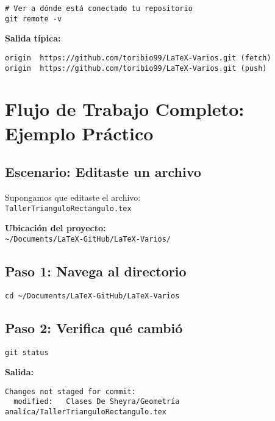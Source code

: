 \documentclass[12pt,a4paper]{article}
\begin{document}
\begin{lstlisting}[style=bashstyle]
# Ver a dónde está conectado tu repositorio
git remote -v
\end{lstlisting}

\textbf{Salida típica:}
\begin{lstlisting}[style=bashstyle]
origin  https://github.com/toribio99/LaTeX-Varios.git (fetch)
origin  https://github.com/toribio99/LaTeX-Varios.git (push)
\end{lstlisting}

\section{Flujo de Trabajo Completo: Ejemplo Práctico}

\subsection{Escenario: Editaste un archivo}

Supongamos que editaste el archivo:\\
\texttt{TallerTrianguloRectangulo.tex}

\textbf{Ubicación del proyecto:}\\
\texttt{\textasciitilde/Documents/LaTeX-GitHub/LaTeX-Varios/}

\subsection{Paso 1: Navega al directorio}

\begin{lstlisting}[style=bashstyle]
cd ~/Documents/LaTeX-GitHub/LaTeX-Varios
\end{lstlisting}

\subsection{Paso 2: Verifica qué cambió}

\begin{lstlisting}[style=bashstyle]
git status
\end{lstlisting}

\textbf{Salida:}
\begin{lstlisting}[style=bashstyle]
Changes not staged for commit:
  modified:   Clases De Sheyra/Geometría analíca/TallerTrianguloRectangulo.tex
\end{lstlisting}
\end{document}
